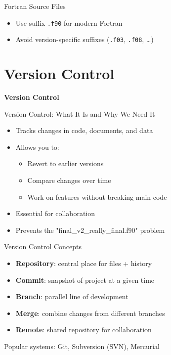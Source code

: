 \begin{frame}{Fortran Source Files}
	\begin{itemize}
		\item Use suffix \texttt{.f90} for modern Fortran
		\item Avoid version-specific suffixes (\texttt{.f03}, \texttt{.f08}, …)
	\end{itemize}
\end{frame}


\section{Version Control}
\begin{frame}
	\centering
	\Huge \textbf{Version Control}
\end{frame}

\begin{frame}{Version Control: What It Is and Why We Need It}
	\begin{itemize}
		\item Tracks changes in code, documents, and data
		\item Allows you to:
		\begin{itemize}
			\item Revert to earlier versions
			\item Compare changes over time
			\item Work on features without breaking main code
		\end{itemize}
		\item Essential for collaboration
		\item Prevents the "final\_v2\_really\_final.f90" problem
	\end{itemize}
\end{frame}

\begin{frame}{Version Control Concepts}
	\begin{itemize}
		\item \textbf{Repository}: central place for files + history
		\item \textbf{Commit}: snapshot of project at a given time
		\item \textbf{Branch}: parallel line of development
		\item \textbf{Merge}: combine changes from different branches
		\item \textbf{Remote}: shared repository for collaboration
	\end{itemize}
	\vspace{0.5em}
	Popular systems: Git, Subversion (SVN), Mercurial  
\end{frame}


